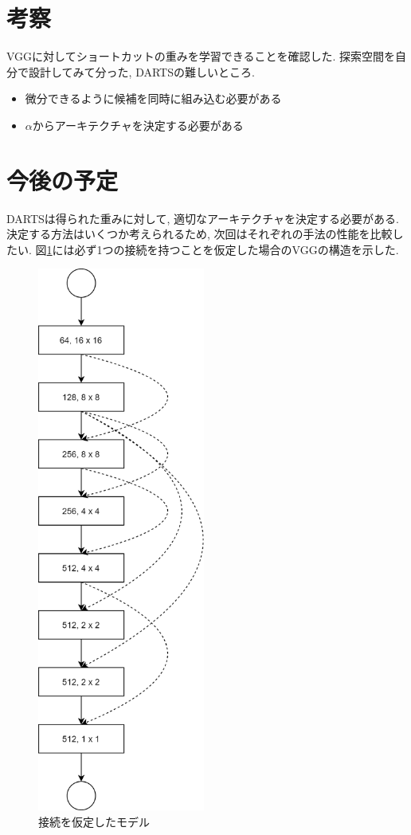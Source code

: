 \documentclass[twocolumn]{jarticle}     %
\begin{document}
\section{考察}

VGGに対してショートカットの重みを学習できることを確認した.
探索空間を自分で設計してみて分った, DARTSの難しいところ.
\begin{itemize}
  \item 微分できるように候補を同時に組み込む必要がある
  \item $\alpha$からアーキテクチャを決定する必要がある
\end{itemize}

\section{今後の予定}

DARTSは得られた重みに対して, 適切なアーキテクチャを決定する必要がある.
決定する方法はいくつか考えられるため, 次回はそれぞれの手法の性能を比較したい.
図\ref{fig:result}には必ず1つの接続を持つことを仮定した場合のVGGの構造を示した.

\begin{figure}[tb]
	\begin{center}
		\includegraphics[clip,width=5.5cm]{result.png}
		\caption{接続を仮定したモデル}
		\label{fig:result}
	\end{center}
\end{figure}
\end{document}
